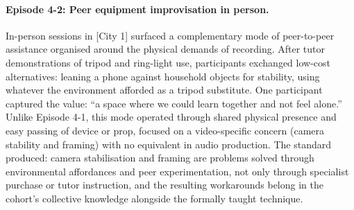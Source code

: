 \paragraph{Episode 4-2: Peer equipment improvisation in person.}
In-person sessions in [City 1] surfaced a complementary mode of peer-to-peer assistance organised around the physical demands of recording. After tutor demonstrations of tripod and ring-light use, participants exchanged low-cost alternatives: leaning a phone against household objects for stability, using whatever the environment afforded as a tripod substitute. One participant captured the value: ``a space where we could learn together and not feel alone.'' Unlike Episode 4-1, this mode operated through shared physical presence and easy passing of device or prop, focused on a video-specific concern (camera stability and framing) with no equivalent in audio production. The standard produced: camera stabilisation and framing are problems solved through environmental affordances and peer experimentation, not only through specialist purchase or tutor instruction, and the resulting workarounds belong in the cohort's collective knowledge alongside the formally taught technique.
